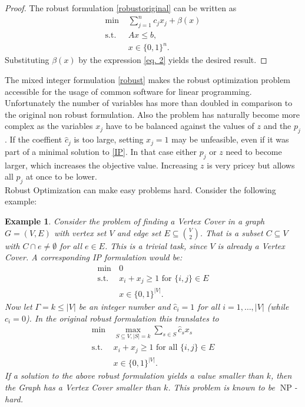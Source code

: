\documentclass[titlepage, a4paper]{amsbook}
\theoremstyle{plain}
\theoremstyle{break}
\newtheorem{exm}[thm]{Example}
\theoremstyle{definition}
\theoremstyle{remark}
\numberwithin{equation}{thm}
\DeclareMathOperator{\NP}{NP}
\begin{document}
\begin{proof}
The robust formulation \eqref{robustoriginal} can be written as 
\begin{equation*}
\begin{split}
    \text{min } &\sum_{j=1}^{n} c_j x_j + \beta(x)\\
    \text{s.t. } &Ax \leq b, \\
    &x \in \{0,1\}^n.
\end{split}
\end{equation*}
Substituting $\beta(x)$ by the expression \eqref{eq. 2} yields the desired result.
\end{proof}
The mixed integer formulation \eqref{robust} makes the robust optimization problem accessible for the usage of common software for linear programming. Unfortunately the number of variables has more than doubled in comparison to the original non robust formulation. Also the problem has naturally become more complex as the variables $x_j$ have to be balanced against the values of $z$ and the $p_j$. If the coeffient $\hat{c}_j$ is too large, setting $x_j=1$ may be unfeasible, even if it was part of a minimal solution to \eqref{IP}. In that case either $p_j$ or $z$ need to become larger, which increases the objective value. Increasing $z$ is very pricey but allows all $p_j$ at once to be lower.\\
Robust Optimization can make easy problems hard. Consider the following example:
\begin{exm}
Consider the problem of finding a Vertex Cover in a graph $G=(V,E)$ with vertex set $V$ and edge set $E\subseteq \binom{V}{2}$. That is a subset $C \subseteq V$ with $C \cap e \neq \emptyset$ for all $e \in E$. This is a trivial task, since $V$ is already a Vertex Cover. A corresponding IP formulation would be:
\begin{equation*}
    \begin{split}
        \min \,& 0 \\
        \text{s.t. }& x_i + x_j \geq 1 \text{ for }\{i,j\} \in E \\
        &x \in \{0,1\}^{\vert V \vert}.
    \end{split}
\end{equation*}
Now let $\Gamma=k \leq \vert V \vert$ be an integer number and $\hat{c}_i=1$ for all $i=1, \ldots, \vert V \vert$ (while $c_i=0$). In the original robust formulation this translates to
\begin{equation*}
    \begin{split}
        \min \,& \max_{S \subseteq V, \vert S \vert =k} \sum_{s \in S} \hat{c}_s x_s \\
        \text{s.t. }& x_i + x_j \geq 1 \text{ for all }\{i,j\} \in E \\
        &x \in \{0,1\}^{\vert V \vert}.
    \end{split}
\end{equation*}
If a solution to the above robust formulation yields a value smaller than $k$, then the Graph has a Vertex Cover smaller than $k$. This problem is known to be $\NP$-hard. 
\end{exm}
\end{document}
